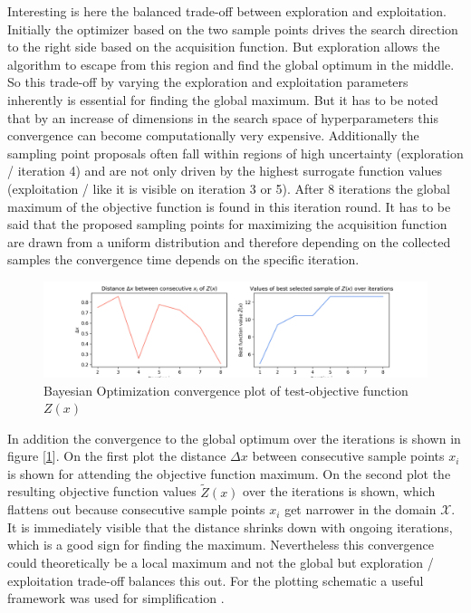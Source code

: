 \documentclass[12pt, a4paper]{article}
\begin{document}
Interesting is here the balanced trade-off between exploration and exploitation. Initially the optimizer based on the two sample points drives the search direction to the right side based on the acquisition function. But exploration allows the algorithm to escape from this region and find the global optimum in the middle. So this trade-off by varying the exploration and exploitation parameters inherently is essential for finding the global maximum. But it has to be noted that by an increase of dimensions in the search space of hyperparameters this convergence can become computationally very expensive. Additionally the sampling point proposals often fall within regions of high uncertainty (exploration / iteration 4) and are not only driven by the highest surrogate function values (exploitation / like it is visible on iteration 3 or 5). After 8 iterations the global maximum of the objective function is found in this iteration round. It has to be said that the proposed sampling points for maximizing the acquisition function are drawn from a uniform distribution and therefore depending on the collected samples the convergence time depends on the specific iteration. \\
\begin{figure}[!htpb]
    \centering
    \includegraphics[width=1\textwidth,trim={0 0 0 0},clip]{figures/bayesian_optimization_from_scratch_convergence_plot.png}
    \caption[Bayesian Optimization convergence plot]{Bayesian Optimization convergence plot of test-objective function $Z(x)$}
    \label{fig: bo_convergence_plot}
\end{figure}
In addition the convergence to the global optimum over the iterations is shown in figure [\ref{fig: bo_convergence_plot}]. On the first plot the distance $\Delta{x}$ between consecutive sample points $x_i$ is shown for attending the objective function maximum. On the second plot the resulting objective function values $\tilde{Z}(x)$ over the iterations is shown, which flattens out because consecutive sample points $x_i$ get narrower in the domain $\mathcal{X}$. It is immediately visible that the distance shrinks down with ongoing iterations, which is a good sign for finding the maximum. Nevertheless this convergence could theoretically be a local maximum and not the global but exploration / exploitation trade-off balances this out. For the plotting schematic a useful framework was used for simplification \cite{Pradeep}.
\newpage
\end{document}
